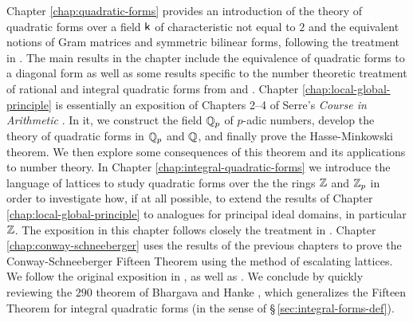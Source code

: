 Chapter \ref{chap:quadratic-forms} provides an introduction of the theory of quadratic forms over a field \(\mathsf{k}\) of characteristic not equal to \(2\) and the equivalent notions of Gram matrices and symmetric bilinear forms, following the treatment in \cite{lam1973quadratic}. The main results in the chapter include the equivalence of quadratic forms to a diagonal form as well as some results specific to the number theoretic treatment of rational and integral quadratic forms from \cite{cassels2008rational} and \cite{jones1950arithmetic}. Chapter \ref{chap:local-global-principle} is essentially an exposition of Chapters 2--4 of Serre's \emph{Course in Arithmetic} \cite{serre2012course}. In it, we construct the field \(\mathbb{Q}_p\) of \(p\)-adic numbers, develop the theory of quadratic forms in \(\mathbb{Q}_p\) and \(\mathbb{Q}\), and finally prove the Hasse-Minkowski theorem. We then explore some consequences of this theorem and its applications to number theory. In Chapter \ref{chap:integral-quadratic-forms} we introduce the language of lattices to study quadratic forms over the the rings \(\mathbb{Z}\) and \(\mathbb{Z}_p\) in order to investigate how, if at all possible, to extend the results of Chapter \ref{chap:local-global-principle} to analogues for principal ideal domains, in particular \(\mathbb{Z}\). The exposition in this chapter follows closely the treatment in \cite{cassels2008rational,gerstein2008basic,jones1950arithmetic}. Chapter \ref{chap:conway-schneeberger} uses the results of the previous chapters to prove the Conway-Schneeberger Fifteen Theorem using the method of escalating lattices. We follow the original exposition in \cite{bhargava2000conway}, as well as \cite{moon2008universal}. We conclude by quickly reviewing the \(290\) theorem of Bhargava and Hanke \cite{bhargava2005universal}, which generalizes the Fifteen Theorem for integral quadratic forms (in the sense of \S\,\ref{sec:integral-forms-def}).